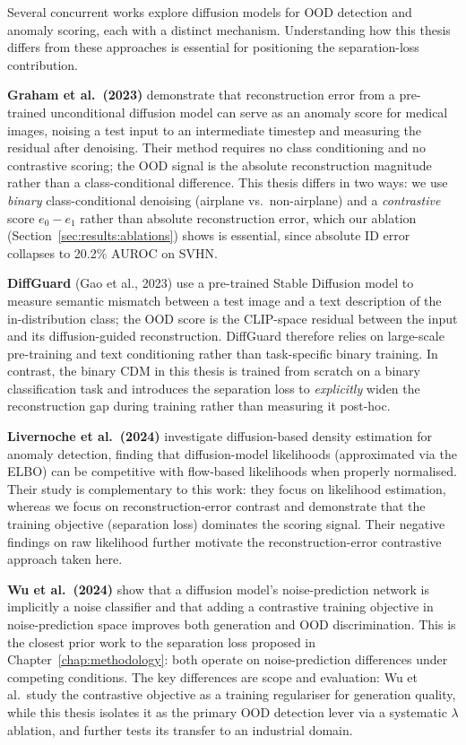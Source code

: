 Several concurrent works explore diffusion models for OOD detection and anomaly scoring, each with a distinct mechanism. Understanding how this thesis differs from these approaches is essential for positioning the separation-loss contribution.

\textbf{Graham et al.\ (2023)} \cite{graham2023denoising} demonstrate that reconstruction error from a pre-trained unconditional diffusion model can serve as an anomaly score for medical images, noising a test input to an intermediate timestep and measuring the residual after denoising. Their method requires no class conditioning and no contrastive scoring; the OOD signal is the absolute reconstruction magnitude rather than a class-conditional difference. This thesis differs in two ways: we use \emph{binary} class-conditional denoising (airplane vs.\ non-airplane) and a \emph{contrastive} score $e_0 - e_1$ rather than absolute reconstruction error, which our ablation (Section~\ref{sec:results:ablations}) shows is essential, since absolute ID error collapses to 20.2\% AUROC on SVHN.

\textbf{DiffGuard} (Gao et al., 2023) \cite{gao2023diffguard} use a pre-trained Stable Diffusion model to measure semantic mismatch between a test image and a text description of the in-distribution class; the OOD score is the CLIP-space residual between the input and its diffusion-guided reconstruction. DiffGuard therefore relies on large-scale pre-training and text conditioning rather than task-specific binary training. In contrast, the binary CDM in this thesis is trained from scratch on a binary classification task and introduces the separation loss to \emph{explicitly} widen the reconstruction gap during training rather than measuring it post-hoc.

\textbf{Livernoche et al.\ (2024)} \cite{livernoche2024diffusion} investigate diffusion-based density estimation for anomaly detection, finding that diffusion-model likelihoods (approximated via the ELBO) can be competitive with flow-based likelihoods when properly normalised. Their study is complementary to this work: they focus on likelihood estimation, whereas we focus on reconstruction-error contrast and demonstrate that the training objective (separation loss) dominates the scoring signal. Their negative findings on raw likelihood further motivate the reconstruction-error contrastive approach taken here.

\textbf{Wu et al.\ (2024)} \cite{wu2024diffusion} show that a diffusion model's noise-prediction network is implicitly a noise classifier and that adding a contrastive training objective in noise-prediction space improves both generation and OOD discrimination. This is the closest prior work to the separation loss proposed in Chapter~\ref{chap:methodology}: both operate on noise-prediction differences under competing conditions. The key differences are scope and evaluation: Wu et al.\ study the contrastive objective as a training regulariser for generation quality, while this thesis isolates it as the primary OOD detection lever via a systematic $\lambda$ ablation, and further tests its transfer to an industrial domain.

